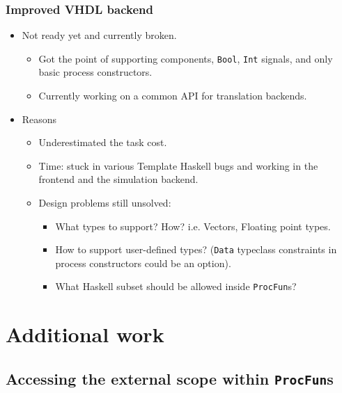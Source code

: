 \documentclass{beamer}
\begin{document}
\begin{frame}
  \frametitle{Improved VHDL backend}
 \begin{itemize}
 \item Not ready yet and currently broken.
   \begin{itemize}
    \item Got the point of supporting components, \texttt{Bool},   \texttt{Int} signals, and only basic process constructors.
   \item Currently working on a common API for translation backends.
   \end{itemize}
 \item Reasons
   \begin{itemize}
   \item Underestimated the task cost.
   \item Time: stuck in various Template Haskell bugs and working in the frontend and the simulation backend.
   \item Design problems still unsolved: 
      \begin{itemize}
      \item What types to support? How? i.e. Vectors, Floating point types.
      \item How to support user-defined types? (\texttt{Data} typeclass constraints in process constructors could be an option).
      \item What Haskell subset should be allowed inside \texttt{ProcFun}s?
      \end{itemize}
   \end{itemize}     
 \end{itemize}
\end{frame}

\section{Additional work}
\subsection{Accessing the external scope within \texttt{ProcFun}s}
\end{document}
